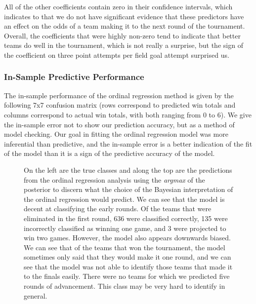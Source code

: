 \documentclass[10pt,a4paper, hidelinks]{article} %
\begin{document}
All of the other coefficients contain zero in their confidence intervals, which indicates to that we do not have significant evidence that these predictors have an effect on the odds of a team making it to the next round of the tournament. Overall, the coefficients that were highly non-zero tend to indicate that better teams do well in the tournament, which is not really a surprise, but the sign of the coefficient on three point attempts per field goal attempt surprised us. 


\subsubsection{In-Sample Predictive Performance}
The in-sample performance of the ordinal regression method is given by the following 7x7 confusion matrix (rows correspond to predicted win totals and columns correspond to actual win totals, with both ranging from 0 to 6). We give the in-sample error not to show our prediction accuracy, but as a method of model checking. Our goal in fitting the ordinal regression model was more inferential than predictive, and the in-sample error is a better indication of the fit of the model than it is a sign of the predictive accuracy of the model. 
\begin{figure}[H]
	\centering
	
\caption{On the left are the true classes and along the top are the predictions from the ordinal regression analysis using the \textit{argmax} of the posterior to discern what the choice of the Bayesian interpretation of the ordinal regression would predict. We can see that the model is decent at classifying the early rounds. Of the teams that were eliminated in the first round, 636 were classified correctly, 135 were incorrectly classified as winning one game, and 3 were projected to win two games. However, the model also appears downwards biased. We can see that of the teams that won the tournament, the model sometimes only said that they would make it one round, and we can see that the model was not able to identify those teams that made it to the finals easily. There were no teams for which we predicted five rounds of advancement. This class may be very hard to identify in general.}
\end{figure}
\end{document}
